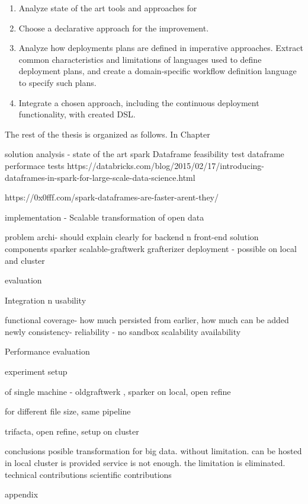 \begin{enumerate}
\item  Analyze state of the art tools and approaches for 

\item  Choose a declarative approach for the improvement.

\item  Analyze how deployments plans are defined in imperative approaches. Extract common characteristics and limitations of languages used to define deployment plans, and create a domain-specific workflow definition language to specify such plans.

\item  Integrate a chosen approach, including the continuous deployment functionality, with created DSL.

\end{enumerate}

\noindent The rest of the thesis is organized as follows. In Chapter 

solution analysis - state of the art spark
Dataframe 
feasibility test
dataframe performace tests
https://databricks.com/blog/2015/02/17/introducing-dataframes-in-spark-for-large-scale-data-science.html

https://0x0fff.com/spark-dataframes-are-faster-arent-they/

implementation - Scalable transformation of open data

problem
archi- should explain clearly for backend n front-end 
solution components
sparker
scalable-graftwerk
grafterizer
deployment - possible on local and cluster 

evaluation

Integration n usability

functional coverage- how much persisted from earlier, how much can be added newly
consistency-
reliability - no sandbox
scalability
availability

Performance evaluation

experiment setup

of single machine - oldgraftwerk , sparker on local, open refine

for different file size, same pipeline

trifacta, open refine, setup on cluster

conclusions
posible transformation for big data. without limitation. can be hosted in local cluster is provided service is not enough. the limitation is eliminated. 
technical contributions
scientific contributions

appendix


